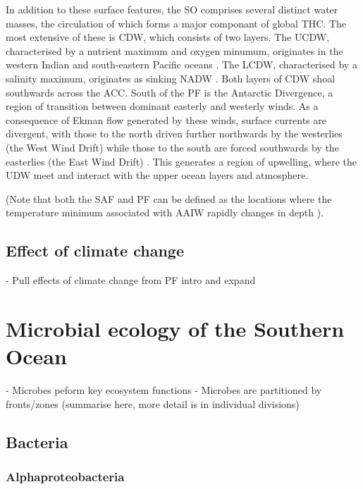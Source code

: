 In addition to these surface features, the \ac{SO} comprises several distinct water masses, the circulation of which forms a major componant of global \ac{THC}.
The most extensive of these is \ac{CDW}, which consists of two layers.
The \ac{UCDW}, characterised by a nutrient maximum and oxygen minumum, originates in the western Indian and south-eastern Pacific oceans \cite{Orsi:1995va}.
The \ac{LCDW}, characterised by a salinity maximum, originates as sinking \ac{NADW} \cite{WhitworthIII:1987ky}.
Both layers of \ac{CDW} shoal southwards across the \ac{ACC}.
South of the \ac{PF} is the Antarctic Divergence, a region of transition between dominant easterly and westerly winds.
As a consequence of Ekman flow generated by these winds, surface currents are divergent, with those to the north driven further northwards by the westerlies (the West Wind Drift) while those to the south are forced southwards by the easterlies (the East Wind Drift) \cite{Foldvik:1988gp}.
This generates a region of upwelling, where the \ac{UDW} meet and interact with the upper ocean layers and atmosphere.




(Note that both the \ac{SAF} and \ac{PF} can be defined as the locations where the temperature minimum associated with \ac{AAIW} rapidly changes in depth \cite{WhitworthIII:1987ky}).

\subsection{Effect of climate change}

  - Pull effects of climate change from PF intro and expand

\section{Microbial ecology of the Southern Ocean}

  - Microbes peform key ecosystem functions
  - Microbes are partitioned by fronts/zones (summarise here, more detail is in individual divisions)

\subsection{Bacteria}

\subsubsection{Alphaproteobacteria}

